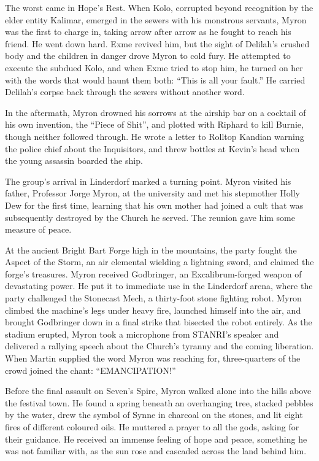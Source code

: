 The worst came in Hope's Rest.  When Kolo, corrupted beyond recognition by the elder entity Kalimar, emerged in the sewers with his monstrous servants, Myron was the first to charge in, taking arrow after arrow as he fought to reach his friend.  He went down hard.  Exme revived him, but the sight of Delilah's crushed body and the children in danger drove Myron to cold fury.  He attempted to execute the subdued Kolo, and when Exme tried to stop him, he turned on her with the words that would haunt them both: ``This is all your fault.''  He carried Delilah's corpse back through the sewers without another word.

In the aftermath, Myron drowned his sorrows at the airship bar on a cocktail of his own invention, the ``Piece of Shit'', and plotted with Riphard to kill Burnie, though neither followed through.  He wrote a letter to Rolltop Kandian warning the police chief about the Inquisitors, and threw bottles at Kevin's head when the young assassin boarded the ship.

The group's arrival in Linderdorf marked a turning point.  Myron visited his father, Professor Jorge Myron, at the university and met his stepmother Holly Dew for the first time, learning that his own mother had joined a cult that was subsequently destroyed by the Church he served.  The reunion gave him some measure of peace.

At the ancient Bright Bart Forge high in the mountains, the party fought the Aspect of the Storm, an air elemental wielding a lightning sword, and claimed the forge's treasures.  Myron received Godbringer, an Excalibrum-forged weapon of devastating power.  He put it to immediate use in the Linderdorf arena, where the party challenged the Stonecast Mech, a thirty-foot stone fighting robot.  Myron climbed the machine's legs under heavy fire, launched himself into the air, and brought Godbringer down in a final strike that bisected the robot entirely.  As the stadium erupted, Myron took a microphone from STANRI's speaker and delivered a rallying speech about the Church's tyranny and the coming liberation.  When Martin supplied the word Myron was reaching for, three-quarters of the crowd joined the chant: ``EMANCIPATION!''

Before the final assault on Seven's Spire, Myron walked alone into the hills above the festival town.  He found a spring beneath an overhanging tree, stacked pebbles by the water, drew the symbol of Synne in charcoal on the stones, and lit eight fires of different coloured oils.  He muttered a prayer to all the gods, asking for their guidance.  He received an immense feeling of hope and peace, something he was not familiar with, as the sun rose and cascaded across the land behind him.


